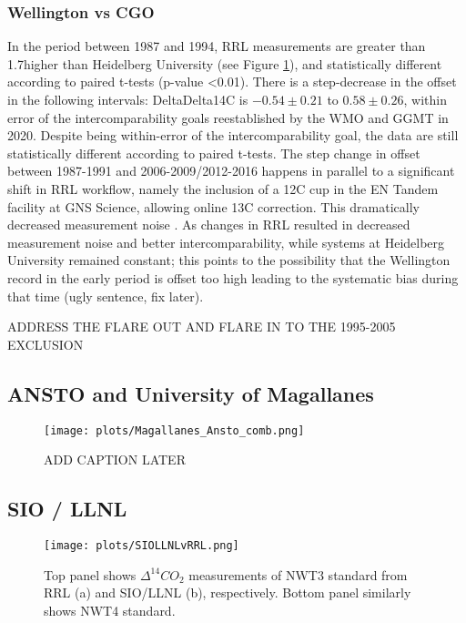 \subsubsection{Wellington vs CGO}
\label{WellingtonvCGO}
In the period between 1987 and 1994, RRL measurements are  greater than 1.7\textperthousand higher than Heidelberg University (see Figure \ref{fig:results1}), and statistically different according to paired t-tests (p-value <0.01). 
There is a step-decrease in the offset in the following intervals: DeltaDelta14C is $-0.54\pm0.21$ to $0.58\pm0.26$, within error of the intercomparability goals reestablished by the WMO and GGMT in 2020. Despite being within-error of the intercomparability goal, the data are still statistically different according to paired t-tests. 
The step change in offset between 1987-1991 and 2006-2009/2012-2016 happens in parallel to a significant shift in RRL workflow, namely the inclusion of a 12C cup in the EN Tandem facility at GNS Science, allowing online 13C correction. This dramatically decreased measurement noise \cite{turnbull2017}.
As changes in RRL resulted in decreased measurement noise and better intercomparability, while systems at Heidelberg University remained constant; this points to the possibility that the Wellington record in the early period is offset too high leading to the systematic bias during that time (ugly sentence, fix later). 

ADDRESS THE FLARE OUT AND FLARE IN TO THE 1995-2005 EXCLUSION


\newpage
\subsection{ANSTO and University of Magallanes}
\begin{figure}[h!]
  \texttt{[image: plots/Magallanes\_Ansto\_comb.png]}
  \caption{ADD CAPTION LATER}
  \label{fig:results1}
\end{figure}

\newpage
\subsection{SIO / LLNL}

\begin{figure}[h!]
  \texttt{[image: plots/SIOLLNLvRRL.png]}
  \caption{Top panel shows ${\Delta^{14}CO_{2}}$ measurements of NWT3 standard from RRL (a) and SIO/LLNL (b), respectively. Bottom panel similarly shows NWT4 standard.}
  \label{fig:siollnl}
\end{figure}

